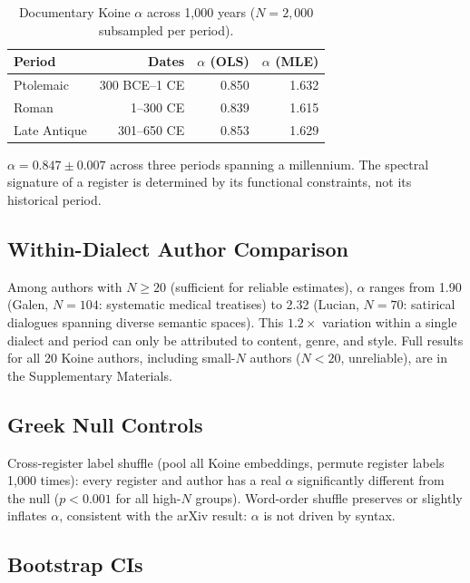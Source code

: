 \documentclass[12pt,letterpaper]{article}
\newcommand{\al}{\alpha}
\begin{document}
\begin{table}[H]
\centering
\caption{Documentary Koine $\al$ across 1{,}000 years
($N = 2{,}000$ subsampled per period).}
\label{tab:temporal}
\begin{tabular}{lrrr}
\toprule
\textbf{Period} & \textbf{Dates} & $\al$ \textbf{(OLS)} &
$\al$ \textbf{(MLE)} \\
\midrule
Ptolemaic & 300 BCE--1 CE & 0.850 & 1.632 \\
Roman & 1--300 CE & 0.839 & 1.615 \\
Late Antique & 301--650 CE & 0.853 & 1.629 \\
\bottomrule
\end{tabular}
\end{table}

$\al = 0.847 \pm 0.007$ across three periods spanning a millennium.
The spectral signature of a register is determined by its functional
constraints, not its historical period.

\subsection{Within-Dialect Author Comparison}

Among authors with $N \geq 20$ (sufficient for reliable estimates),
$\al$ ranges from 1.90 (Galen, $N = 104$: systematic medical
treatises) to 2.32 (Lucian, $N = 70$: satirical dialogues spanning
diverse semantic spaces).  This $1.2\times$ variation within a
single dialect and period can only be attributed to content, genre,
and style.  Full results for all 20 Koine authors, including
small-$N$ authors ($N < 20$, unreliable), are in the Supplementary
Materials.

\subsection{Greek Null Controls}

Cross-register label shuffle (pool all Koine embeddings, permute
register labels 1{,}000 times): every register and author has a
real $\al$ significantly different from the null ($p < 0.001$ for
all high-$N$ groups).  Word-order shuffle preserves or slightly
inflates $\al$, consistent with the arXiv result: $\al$ is not
driven by syntax.

\subsection{Bootstrap CIs}
\end{document}
